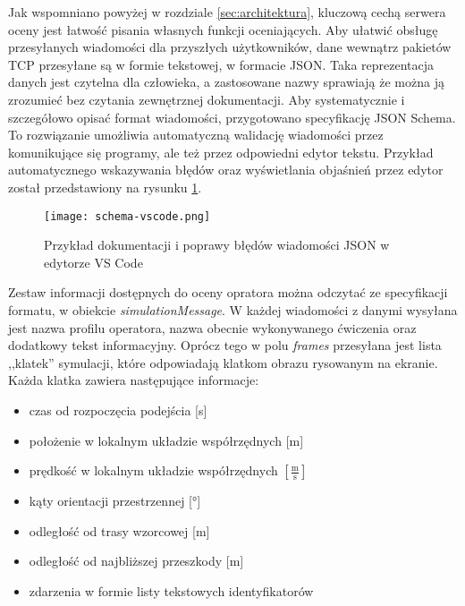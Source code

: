 Jak wspomniano powyżej w rozdziale \ref{sec:architektura}, kluczową cechą serwera oceny jest łatwość pisania własnych funkcji oceniających. Aby ułatwić obsługę przesyłanych wiadomości dla przyszłych użytkowników, dane wewnątrz pakietów TCP przesyłane są w formie tekstowej, w formacie JSON\cite{json2017}. Taka reprezentacja danych jest czytelna dla człowieka, a zastosowane nazwy sprawiają że można ją zrozumieć bez czytania zewnętrznej dokumentacji. Aby systematycznie i szczegółowo opisać format wiadomości, przygotowano specyfikację JSON Schema\cite{jsonschema2020}. To rozwiązanie umożliwia automatyczną walidację wiadomości przez komunikujące się programy, ale też przez odpowiedni edytor tekstu. Przykład automatycznego wskazywania błędów oraz wyświetlania objaśnień przez edytor został przedstawiony na rysunku \ref{fig:schema-vscode}.

\begin{figure}[!h]
    \caption{Przykład dokumentacji i poprawy błędów wiadomości JSON w edytorze VS Code}
    \label{fig:schema-vscode}
    \centering \texttt{[image: schema-vscode.png]}
\end{figure}

Zestaw informacji dostępnych do oceny opratora można odczytać ze specyfikacji formatu, w obiekcie \emph{simulationMessage}. W każdej wiadomości z danymi wysyłana jest nazwa profilu operatora, nazwa obecnie wykonywanego ćwiczenia oraz dodatkowy tekst informacyjny. Oprócz tego w polu \emph{frames} przesyłana jest lista ,,klatek'' symulacji, które odpowiadają klatkom obrazu rysowanym na ekranie. Każda klatka zawiera następujące informacje:

\begin{itemize}
    \item czas od rozpoczęcia podejścia [s]
    \item położenie w lokalnym układzie współrzędnych [m]
    \item prędkość w lokalnym układzie współrzędnych $ \left[ \frac{\text{m}}{\text{s}} \right] $
    \item kąty orientacji przestrzennej [°]
    \item odległość od trasy wzorcowej [m]
    \item odległość od najbliższej przeszkody [m]
    \item zdarzenia w formie listy tekstowych identyfikatorów
\end{itemize}

